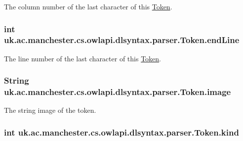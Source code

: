 The column number of the last character of this \hyperlink{classuk_1_1ac_1_1manchester_1_1cs_1_1owlapi_1_1dlsyntax_1_1parser_1_1_token}{Token}. \hypertarget{classuk_1_1ac_1_1manchester_1_1cs_1_1owlapi_1_1dlsyntax_1_1parser_1_1_token_adba43fc85c0d248ce9bcc8034e61bbe7}{
\subsubsection[{end\-Line}]{\setlength{\rightskip}{0pt plus 5cm}int uk.\-ac.\-manchester.\-cs.\-owlapi.\-dlsyntax.\-parser.\-Token.\-end\-Line}}\label{classuk_1_1ac_1_1manchester_1_1cs_1_1owlapi_1_1dlsyntax_1_1parser_1_1_token_adba43fc85c0d248ce9bcc8034e61bbe7}
The line number of the last character of this \hyperlink{classuk_1_1ac_1_1manchester_1_1cs_1_1owlapi_1_1dlsyntax_1_1parser_1_1_token}{Token}. \hypertarget{classuk_1_1ac_1_1manchester_1_1cs_1_1owlapi_1_1dlsyntax_1_1parser_1_1_token_a164b422e7ed8f52d725f36829e7691de}{
\subsubsection[{image}]{\setlength{\rightskip}{0pt plus 5cm}String uk.\-ac.\-manchester.\-cs.\-owlapi.\-dlsyntax.\-parser.\-Token.\-image}}\label{classuk_1_1ac_1_1manchester_1_1cs_1_1owlapi_1_1dlsyntax_1_1parser_1_1_token_a164b422e7ed8f52d725f36829e7691de}
The string image of the token. \hypertarget{classuk_1_1ac_1_1manchester_1_1cs_1_1owlapi_1_1dlsyntax_1_1parser_1_1_token_acca2ffb5b7d9c23e5c81883c10856b43}{
\subsubsection[{kind}]{\setlength{\rightskip}{0pt plus 5cm}int uk.\-ac.\-manchester.\-cs.\-owlapi.\-dlsyntax.\-parser.\-Token.\-kind}}\label{classuk_1_1ac_1_1manchester_1_1cs_1_1owlapi_1_1dlsyntax_1_1parser_1_1_token_acca2ffb5b7d9c23e5c81883c10856b43}
